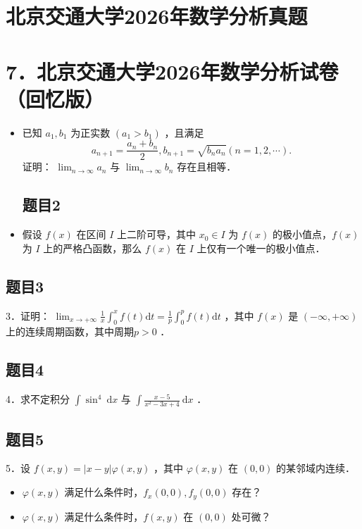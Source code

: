 \documentclass{article}
\begin{document}
\section*{北京交通大学2026年数学分析真题}
\section*{7．北京交通大学2026年数学分析试卷（回忆版）}
\begin{itemize}

\subsection{题目1}
  \item[1．] 已知 \(a_{1}, b_{1}\) 为正实数 \(\left(a_{1}>b_{1}\right)\) ，且满足
\[
a_{n+1}=\frac{a_{n}+b_{n}}{2}, b_{n+1}=\sqrt{b_{n} a_{n}}(n=1,2, \cdots) .
\]
证明： \(\lim _{n \rightarrow \infty} a_{n}\) 与 \(\lim _{n \rightarrow \infty} b_{n}\) 存在且相等．

\subsection{题目2}
  \item[2．] 假设 \(f(x)\) 在区间 \(I\) 上二阶可导，其中 \(x_{0} \in I\) 为 \(f(x)\) 的极小值点，\(f(x)\) 为 \(I\) 上的严格凸函数，那么 \(f(x)\) 在 \(I\) 上仅有一个唯一的极小值点．
\end{itemize}

\subsection{题目3}
3．证明： \(\lim _{x \rightarrow+\infty} \frac{1}{x} \int_{0}^{x} f(t) \mathrm{d} t=\frac{1}{p} \int_{0}^{p} f(t) \mathrm{d} t\) ，其中 \(f(x)\) 是 \((-\infty,+\infty)\) 上的连续周期函数，其中周期\(p>0\) ．

\subsection{题目4}
4．求不定积分 \(\int \sin ^{4} \mathrm{~d} x\) 与 \(\int \frac{x-5}{x^{2}-3 x+4} \mathrm{~d} x\) ．

\subsection{题目5}
5．设 \(f(x, y)=|x-y| \varphi(x, y)\) ，其中 \(\varphi(x, y)\) 在 \((0,0)\) 的某邻域内连续．

\begin{itemize}
  \item[（1）] \(\varphi(x, y)\) 满足什么条件时，\(f_{x}(0,0), f_{y}(0,0)\) 存在？
  \item[（2）] \(\varphi(x, y)\) 满足什么条件时，\(f(x, y)\) 在 \((0,0)\) 处可微？
\end{itemize}
\end{document}
